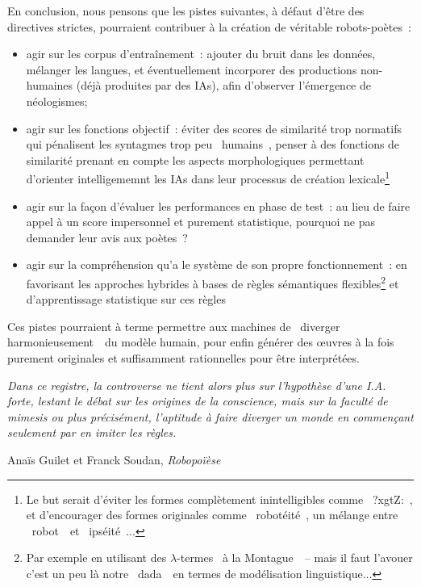 \documentclass{article}
\newenvironment{citationbox}
{\begin{center}
		\begin{minipage}{.8\textwidth}
		}
		{
		\end{minipage}	
\end{center}
}
\begin{document}
				En conclusion, nous pensons que les pistes suivantes, à défaut d'être des directives strictes, pourraient contribuer à la création de véritable robots-poètes~:
				\vspace{2mm}
				\begin{itemize}
					\item agir sur les corpus d'entraînement~: ajouter du bruit dans les données, mélanger les langues, et éventuellement incorporer des productions non-humaines (déjà produites par des IAs), afin d'observer l'émergence de néologismes;
					\item agir sur les fonctions objectif~: éviter des scores de similarité trop normatifs qui pénalisent les syntagmes trop peu \guillemotleft~humains~\guillemotright, penser à des fonctions de similarité prenant en compte les aspects morphologiques permettant d'orienter intelligememnt les IAs dans leur processus de création lexicale\footnote{Le but serait d'éviter les formes complètement inintelligibles comme \guillemotleft~?xgtZ:~\guillemotright, et d'encourager des formes originales comme \guillemotleft~robotéité~\guillemotright, un mélange entre \guillemotleft~robot~\guillemotright~et \guillemotleft~ipséité~\guillemotright...}
					\item agir sur la façon d'évaluer les performances en phase de test~: au lieu de faire appel à un score impersonnel et purement statistique, pourquoi ne pas demander leur avis aux poètes~? 
					\item agir sur la compréhension qu'a le système de son propre fonctionnement~: en favorisant les approches hybrides à bases de règles sémantiques flexibles\footnote{Par exemple en utilisant des $\lambda$-termes \guillemotleft~à la Montague~\guillemotright~-- mais il faut l'avouer c'est un peu là notre \guillemotleft~dada~\guillemotright~en termes de modélisation linguistique...} et d'apprentissage statistique sur ces règles
				\end{itemize}
				\vspace{2mm}
				Ces pistes pourraient à terme permettre aux machines de \guillemotleft~diverger harmonieusement~\guillemotright~du modèle humain, pour enfin générer des œuvres à la fois purement originales et suffisamment rationnelles pour être interprétées.
				\begin{citationbox}
					\textit{Dans ce registre, la controverse ne tient alors plus sur l'hypothèse d'une I.A. forte, lestant le débat sur les origines de la conscience, mais sur la faculté de mimesis ou plus précisément, l'aptitude à faire diverger un monde en commençant seulement par en imiter les règles.}
					\begin{flushright}
						Anaïs Guilet et Franck Soudan, \textit{Robopoïèse} \autocite{guilet2017}
					\end{flushright}
				\end{citationbox}
	
\end{document}
